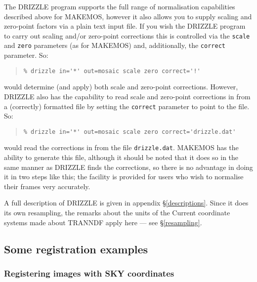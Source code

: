 \documentclass[twoside,11pt]{article}
\newcommand{\hyperref}[4]{#2\ref{#4}#3}
\newcommand{\htmlref}[2]{#1}
\newcommand{\xlabel}[1]{}
\renewcommand{\_}{\texttt{\symbol{95}}}
\newenvironment{myquote}{\begin{quote}\begin{small}}{\end{small}\end{quote}}
\newcommand{\text}[1]{{\small \tt #1}}
\newcommand{\routine}[1]{{\sc #1}}
\newcommand{\xroutine}[1]{\htmlref{{\sc #1}}{#1}}
\begin{document}
The \routine{DRIZZLE} program supports the full range of normalisation
capabilities described above for \routine{MAKEMOS}, however
it also allows you to supply scaling and zero-point factors via a
plain text input file.
If you wish the \routine{DRIZZLE} program to carry out scaling and/or
zero-point corrections this is controlled via the \text{scale} and
\text{zero} parameters (as for \routine{MAKEMOS}) and, additionally,
the \text{correct} parameter. So:
\begin{myquote}
\begin{verbatim}
% drizzle in='*' out=mosaic scale zero correct='!'
\end{verbatim}
\end{myquote}
would determine (and apply) both scale and zero-point corrections. However,
\routine{DRIZZLE} also has the capability to read scale and zero-point
corrections in from a (correctly) formatted file by setting the
\text{correct} parameter to point to the file. So:
\begin{myquote}
\begin{verbatim}
% drizzle in='*' out=mosaic scale zero correct='drizzle.dat'
\end{verbatim}
\end{myquote}
would read the corrections in from the file {\tt drizzle.dat}. 
\routine{MAKEMOS} has the ability to generate this file,
although it should be noted that it does so in the same manner as
\routine{DRIZZLE} finds the corrections, so there is no advantage in
doing it in two steps like this; the facility is provided 
for users who wish to normalise their frames very accurately. 

A full description of \xroutine{DRIZZLE} is
given in appendix \S\ref{descriptions}.
Since it does its own resampling, the remarks 
about the units of the Current coordinate systems made about
\routine{TRANNDF} apply here --- 
see \hyperref{the section on resampling}{\S }{}{resampling}.



\subsection{\xlabel{regexamples}\label{regexamples}Some registration examples}

\subsubsection{Registering images with SKY coordinates}
\end{document}
